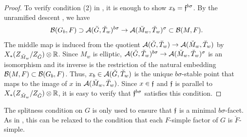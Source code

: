 \documentclass[12pt,reqno]{amsart}
\begin{document}
\begin{proof}
    To verify condition (2) in , it is enough to show $x_b = {\mathfrak{f}}^{b\sigma}$. By the unramified descent \cite[Axiom 4.1.27]{KP23}, we have  
    \[
        {\mathcal{B}}(G_b, F) \supset {\mathcal{A}}(\breve{G}, \breve{T}_w)^{b\sigma} \to {\mathcal{A}}(\breve{M}_w, \breve{T}_w)^{\sigma}  \subset {\mathcal{B}}(M, F). 
    \]  
    The middle map is induced from the quotient ${\mathcal{A}}(\breve{G}, \breve{T}_w) \to {\mathcal{A}}(\breve{M}_w, \breve{T}_w)$ by $X_*(Z_{\breve{M}_w} / Z_{\breve{G}}) \otimes \mathbb{R}$. Since $M_w$ is elliptic, ${\mathcal{A}}(\breve{G}, \breve{T}_w)^{b\sigma} \to {\mathcal{A}}(\breve{M}_w, \breve{T}_w)^{\sigma}$ is an isomorphism and its inverse is the restriction of the natural embedding ${\mathcal{B}}(M, F) \subset {\mathcal{B}}(G_b, F)$. Thus, $x_b \in {\mathcal{A}}(\breve{G}, \breve{T}_w)$ is the unique $b\sigma$-stable point that maps to the image of $x$ in $
    {\mathcal{A}}(\breve{M}_w, \breve{T}_w)$. Since $x \in {\mathfrak{f}}$ and ${\mathfrak{f}}$ is parallel to $X_*(Z_{\breve{M}_w} / Z_{\breve{G}}) \otimes \mathbb{R}$, it is easy to verify that ${\mathfrak{f}}^{b\sigma}$ satisfies this condition. 
\end{proof}

\begin{rmk}
    The splitness condition on $G$ is only used to ensure that ${\mathfrak{f}}$ is a minimal $b\sigma$-facet. As in \cite[Corollary 5.3]{Tak25z}, this can be relaxed to the condition that each $F$-simple factor of $G$ is $\breve{F}$-simple. 
\end{rmk}
\end{document}
